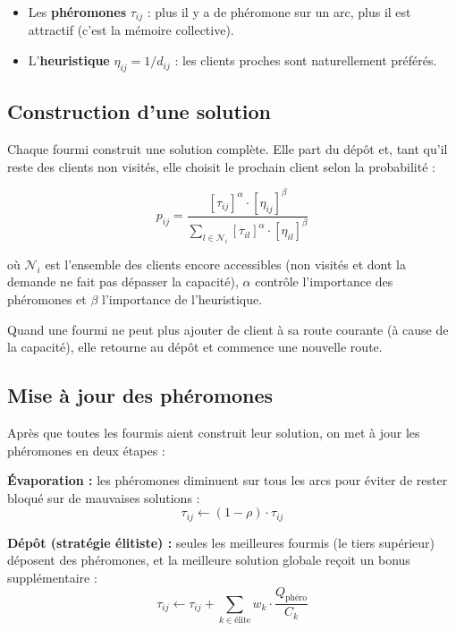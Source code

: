 \documentclass[12pt, a4paper]{article}
\begin{document}
\begin{itemize}
    \item Les \textbf{phéromones} $\tau_{ij}$ : plus il y a de phéromone sur un arc, plus il est attractif (c'est la mémoire collective).
    \item L'\textbf{heuristique} $\eta_{ij} = 1/d_{ij}$ : les clients proches sont naturellement préférés.
\end{itemize}

\subsection{Construction d'une solution}

Chaque fourmi construit une solution complète. Elle part du dépôt et, tant qu'il reste des clients non visités, elle choisit le prochain client selon la probabilité :

\begin{equation}
    p_{ij} = \frac{[\tau_{ij}]^\alpha \cdot [\eta_{ij}]^\beta}{\sum_{l \in \mathcal{N}_i} [\tau_{il}]^\alpha \cdot [\eta_{il}]^\beta}
\end{equation}

où $\mathcal{N}_i$ est l'ensemble des clients encore accessibles (non visités et dont la demande ne fait pas dépasser la capacité), $\alpha$ contrôle l'importance des phéromones et $\beta$ l'importance de l'heuristique.

Quand une fourmi ne peut plus ajouter de client à sa route courante (à cause de la capacité), elle retourne au dépôt et commence une nouvelle route.

\subsection{Mise à jour des phéromones}

Après que toutes les fourmis aient construit leur solution, on met à jour les phéromones en deux étapes :

\textbf{Évaporation :} les phéromones diminuent sur tous les arcs pour éviter de rester bloqué sur de mauvaises solutions :
\begin{equation}
    \tau_{ij} \leftarrow (1 - \rho) \cdot \tau_{ij}
\end{equation}

\textbf{Dépôt (stratégie élitiste) :} seules les meilleures fourmis (le tiers supérieur) déposent des phéromones, et la meilleure solution globale reçoit un bonus supplémentaire :
\begin{equation}
    \tau_{ij} \leftarrow \tau_{ij} + \sum_{k \in \text{élite}} w_k \cdot \frac{Q_{\text{phéro}}}{C_k}
\end{equation}
\end{document}
